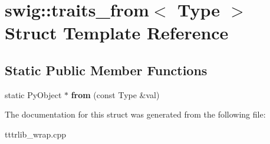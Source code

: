 \hypertarget{structswig_1_1traits__from}{}\section{swig\+:\+:traits\+\_\+from$<$ Type $>$ Struct Template Reference}
\label{structswig_1_1traits__from}
\subsection*{Static Public Member Functions}
\begin{DoxyCompactItemize}
\item 
\mbox{\label{structswig_1_1traits__from_a502976b6bea889bcc35d0aed72e8d901}} 
static Py\+Object $\ast$ {\bfseries from} (const Type \&val)
\end{DoxyCompactItemize}


The documentation for this struct was generated from the following file\+:\begin{DoxyCompactItemize}
\item 
tttrlib\+\_\+wrap.\+cpp\end{DoxyCompactItemize}
